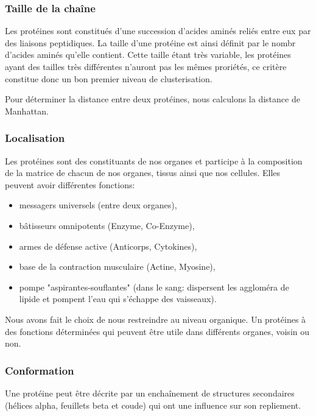 \subsubsection*{Taille de la chaîne}
Les protéines sont constitués d'une succession d'acides aminés reliés entre eux par des liaisons peptidiques. La taille d'une protéine est ainsi définit par le nombr d'acides aminés qu'elle contient. Cette taille étant très variable, les protéines ayant des tailles très différentes n'auront pas les m\^emes proriétés, ce critère constitue donc un bon premier niveau de clusterisation.

Pour déterminer la distance entre deux protéines, nous calculons la distance de Manhattan.%



\subsubsection*{Localisation}
Les protéines sont des constituants de nos organes et participe à la composition de la matrice de chacun de nos organes, tissus ainsi que nos cellules. Elles peuvent avoir différentes fonctions:
\begin{itemize}
\item messagers universels (entre deux organes),
\item bâtisseurs omnipotents (Enzyme, Co-Enzyme),
\item armes de défense active (Anticorps, Cytokines),
\item base de la contraction musculaire (Actine, Myosine),  
\item pompe "aspirantes-souflantes" (dans le sang: dispersent les aggloméra de lipide et pompent l'eau qui s'échappe des vaisseaux). \\
\end{itemize}

Nous avons fait le choix de nous restreindre au niveau organique. Un protéines à des fonctions déterminées qui peuvent être utile dans différents organes, voisin ou non. \\


\subsubsection*{Conformation}
Une protéine peut être décrite par un enchaînement de structures secondaires (hélices alpha, feuillets beta et coude) qui ont une influence sur son repliement. 

